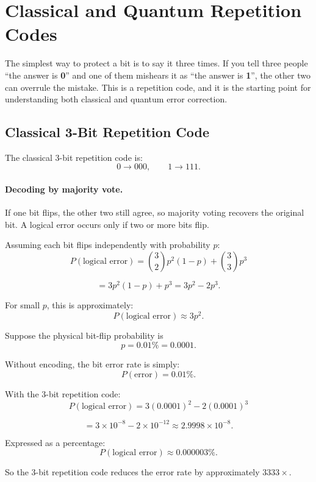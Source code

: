 \documentclass[11pt, a4paper]{article}
\theoremstyle{definition}
\theoremstyle{plain}
\theoremstyle{remark}
\begin{document}
\newpage
\section{Classical and Quantum Repetition Codes}
\label{sec:repetition}

\begin{intuition}
The simplest way to protect a bit is to say it three times.  If you tell
three people ``the answer is \textbf{0}'' and one of them mishears it as
``the answer is \textbf{1}'', the other two can overrule the mistake.  This is
a repetition code, and it is the starting point for understanding both
classical and quantum error correction.
\end{intuition}

\subsection{Classical 3-Bit Repetition Code}

The classical 3-bit repetition code is:
\[
  0 \longrightarrow 000, \qquad 1 \longrightarrow 111.
\]

\paragraph{Decoding by majority vote.}
If one bit flips, the other two still agree, so majority voting
recovers the original bit. A logical error occurs only if two
or more bits flip.

Assuming each bit flips independently with probability $p$:
\[
  P(\text{logical error})
  =
  \binom{3}{2}p^2(1-p)+\binom{3}{3}p^3
\]

\[
  =
  3p^2(1-p)+p^3
  =
  3p^2-2p^3.
\]

For small $p$, this is approximately:
\[
  P(\text{logical error}) \approx 3p^2.
\]

\begin{workedexample}
Suppose the physical bit-flip probability is
\[
  p = 0.01\% = 0.0001.
\]

Without encoding, the bit error rate is simply:
\[
  P(\text{error}) = 0.01\%.
\]

With the 3-bit repetition code:
\[
  P(\text{logical error})
  =
  3(0.0001)^2-2(0.0001)^3
\]

\[
  =
  3\times10^{-8}-2\times10^{-12}
  \approx 2.9998\times10^{-8}.
\]

Expressed as a percentage:
\[
  P(\text{logical error})
  \approx 0.000003\%.
\]

So the 3-bit repetition code reduces the error rate by
approximately $3333\times$.
\end{workedexample}
\end{document}

